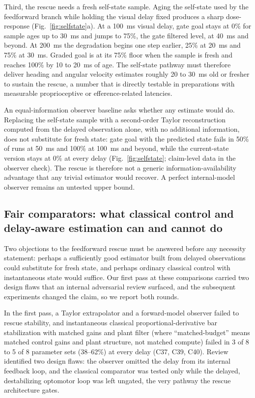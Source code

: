 \documentclass[pdflatex,sn-nature]{sn-jnl}
\begin{document}
Third, the rescue needs a fresh self-state sample. Aging the self-state used by the feedforward branch while holding the visual delay fixed produces a sharp dose-response (Fig.~\ref{fig:selfstate}a). At a 100~ms visual delay, gate goal stays at 0\% for sample ages up to 30~ms and jumps to 75\%, the gate filtered level, at 40~ms and beyond. At 200~ms the degradation begins one step earlier, 25\% at 20~ms and 75\% at 30~ms. Graded goal is at its 75\% floor when the sample is fresh and reaches 100\% by 10 to 20~ms of age. The self-state pathway must therefore deliver heading and angular velocity estimates roughly 20 to 30~ms old or fresher to sustain the rescue, a number that is directly testable in preparations with measurable proprioceptive or efference-related latencies.

An equal-information observer baseline asks whether any estimate would do. Replacing the self-state sample with a second-order Taylor reconstruction computed from the delayed observation alone, with no additional information, does not substitute for fresh state: gate goal with the predicted state fails in 50\% of runs at 50~ms and 100\% at 100~ms and beyond, while the current-state version stays at 0\% at every delay (Fig.~\ref{fig:selfstate}; claim-level data in the observer check). The rescue is therefore not a generic information-availability advantage that any trivial estimator would recover. A perfect internal-model observer remains an untested upper bound.

\subsection{Fair comparators: what classical control and delay-aware estimation can and cannot do}

Two objections to the feedforward rescue must be answered before any necessity statement: perhaps a sufficiently good estimator built from delayed observations could substitute for fresh state, and perhaps ordinary classical control with instantaneous state would suffice. Our first pass at these comparisons carried two design flaws that an internal adversarial review surfaced, and the subsequent experiments changed the claim, so we report both rounds.

In the first pass, a Taylor extrapolator and a forward-model observer failed to rescue stability, and instantaneous classical proportional-derivative bar stabilization with matched gains and plant filter (where ``matched-budget'' means matched control gains and plant structure, not matched compute) failed in 3 of 8 to 5 of 8 parameter sets (38--62\%) at every delay (C37, C39, C40). Review identified two design flaws: the observer omitted the delay from its internal feedback loop, and the classical comparator was tested only while the delayed, destabilizing optomotor loop was left ungated, the very pathway the rescue architecture gates.
\end{document}
